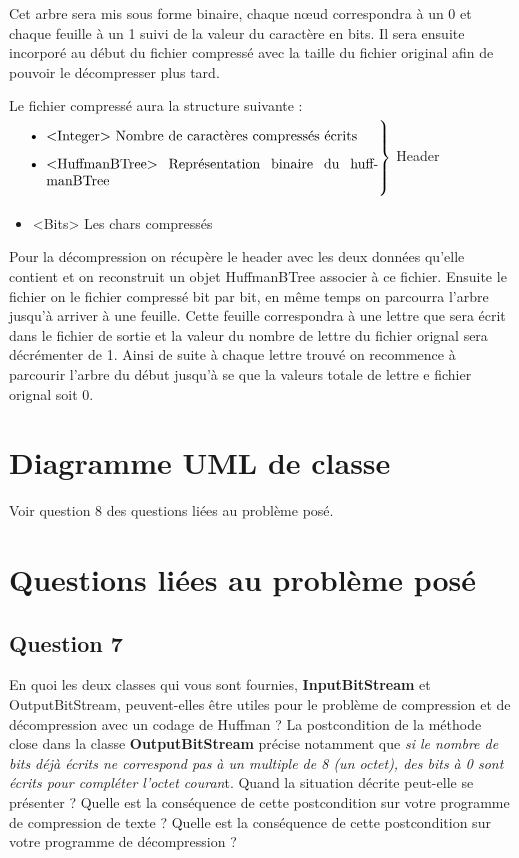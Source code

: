 \documentclass[11pt]{article}
\begin{document}
Cet arbre sera mis sous forme binaire, chaque nœud correspondra à un 0 et chaque feuille à un 1 suivi de la valeur du caractère en bits. Il sera ensuite incorporé au début du fichier compressé avec la taille du fichier original afin de pouvoir le décompresser plus tard.

Le fichier compressé aura la structure suivante : \\
$\left. \text{\parbox{0.76\linewidth}{
\begin{itemize}
\item <Integer> Nombre de caractères compressés écrits
\item <HuffmanBTree> Représentation binaire du huffmanBTree
\end{itemize}
}} \right \}$ Header 
\begin{itemize}
\item <Bits> Les chars compressés \\
\end{itemize} 

Pour la décompression on récupère le header avec les deux données qu'elle contient et on reconstruit un objet HuffmanBTree associer à ce fichier. Ensuite le fichier on le fichier compressé bit par bit, en même temps on parcourra l'arbre jusqu'à arriver à une feuille. Cette feuille correspondra à une lettre que sera écrit dans le fichier de sortie et la valeur du nombre de lettre du fichier orignal sera décrémenter de 1. Ainsi de suite à chaque lettre trouvé on recommence à parcourir l'arbre du début jusqu'à se que la valeurs totale de lettre e fichier orignal soit 0.


\section{Diagramme UML de classe}
Voir question 8 des questions liées au problème posé.

\section{Questions liées au problème posé}

\subsection*{Question 7}
En quoi les deux classes qui vous sont fournies, \textbf{InputBitStream} et OutputBitStream, peuvent-elles être utiles pour le problème de compression et de décompression avec un codage de Huffman ?
La postcondition de la méthode close dans la classe \textbf{OutputBitStream} précise notamment que \textit{si le nombre de bits déjà écrits ne correspond pas à un multiple de 8 (un octet), des bits à 0 sont écrits pour compléter l’octet couran}t. Quand la situation décrite peut-elle se présenter ? Quelle est la conséquence de cette postcondition sur votre programme de compression de texte ? Quelle est la conséquence de cette postcondition sur votre programme de décompression ? \\
\end{document}
